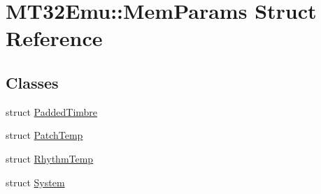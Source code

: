 \hypertarget{structMT32Emu_1_1MemParams}{\section{M\-T32\-Emu\-:\-:Mem\-Params Struct Reference}
\label{structMT32Emu_1_1MemParams}
}
\subsection*{Classes}
\begin{DoxyCompactItemize}
\item 
struct \hyperlink{structMT32Emu_1_1MemParams_1_1PaddedTimbre}{Padded\-Timbre}
\item 
struct \hyperlink{structMT32Emu_1_1MemParams_1_1PatchTemp}{Patch\-Temp}
\item 
struct \hyperlink{structMT32Emu_1_1MemParams_1_1RhythmTemp}{Rhythm\-Temp}
\item 
struct \hyperlink{structMT32Emu_1_1MemParams_1_1System}{System}
\end{DoxyCompactItemize}
